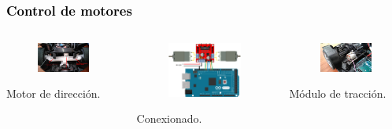 \documentclass[xcolor=x11names,compress]{beamer}
\theoremstyle{cuadrado}
\begin{document}
\begin{frame}[fragile]
\frametitle{\textcolor{black}{ Control de motores }}

\begin{columns}
\begin{column}{0.4\textwidth}
\begin{figure}[H]
  \includegraphics[width=3cm]{motor-direccion.jpg}
\end{figure}
\begin{center}
\caption{Motor de dirección.} 
\end{center}
\end{column}



\begin{column}{0.4\textwidth}
\begin{figure}[H]
  \includegraphics[width=4cm]{L298N_conexionado.png}
\end{figure}
\begin{center}
\caption{Conexionado.} 
\end{center}
\end{column}


\begin{column}{0.4\textwidth}
\begin{figure}[H]
  \includegraphics[width=3cm]{motor-traccion.jpg}
\end{figure}
\begin{center}
\caption{Módulo de tracción.} 
\end{center}
\end{column}


\end{columns}

\end{frame}
\end{document}
